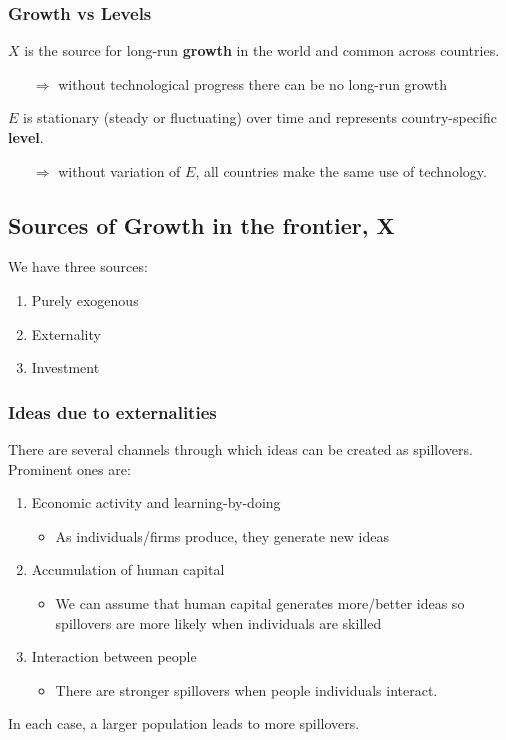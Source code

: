 \documentclass[11pt]{article}
\begin{document}
\subsubsection*{Growth vs Levels}

$X$ is the source for long-run \textbf{growth} in the world and common across countries.
\begin{itemize}
    \item [$\Rightarrow$]  without technological progress there can be no long-run growth
\end{itemize}


$E$ is stationary (steady or fluctuating) over time and represents country-specific \textbf{level}.
\begin{itemize}
    \item [$\Rightarrow$]  without variation of $E$, all countries make the same use of technology.
\end{itemize}

\subsection{Sources of Growth in the frontier, X}
We have three sources:
\begin{enumerate}
    \item Purely exogenous
    \item Externality
    \item Investment
\end{enumerate}

\newpage

\subsubsection{Ideas due to externalities}

There are several channels through which ideas can be created as spillovers. Prominent ones are:
\begin{enumerate}
    \item Economic activity and learning-by-doing
    \begin{itemize}
        \item As individuals/firms produce, they generate new ideas
    \end{itemize}
    \item Accumulation of human capital
    \begin{itemize}
        \item We can assume that human capital generates more/better ideas so spillovers are more likely when individuals are skilled
    \end{itemize}
    \item Interaction between people
    \begin{itemize}
        \item There are stronger spillovers when people individuals interact. 
    \end{itemize}
\end{enumerate}
In each case, a larger population leads to more spillovers.
\end{document}
